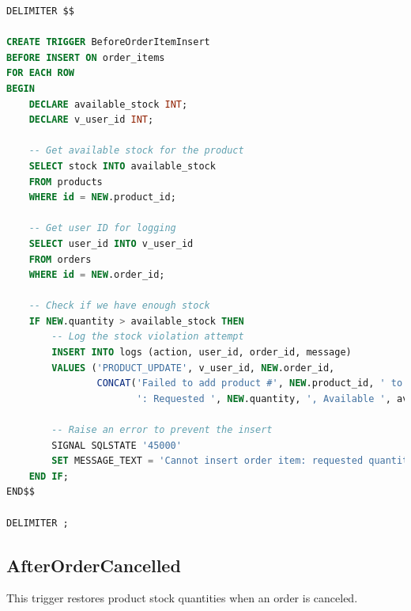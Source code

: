 \documentclass[14pt,a4paper]{article}
\begin{document}
\begin{lstlisting}[language=SQL, caption={BeforeOrderItemInsert Trigger}, label={lst:before-order-item-insert}]
DELIMITER $$

CREATE TRIGGER BeforeOrderItemInsert
BEFORE INSERT ON order_items
FOR EACH ROW
BEGIN
    DECLARE available_stock INT;
    DECLARE v_user_id INT;
    
    -- Get available stock for the product
    SELECT stock INTO available_stock
    FROM products
    WHERE id = NEW.product_id;
    
    -- Get user ID for logging
    SELECT user_id INTO v_user_id
    FROM orders
    WHERE id = NEW.order_id;

    -- Check if we have enough stock
    IF NEW.quantity > available_stock THEN
        -- Log the stock violation attempt
        INSERT INTO logs (action, user_id, order_id, message)
        VALUES ('PRODUCT_UPDATE', v_user_id, NEW.order_id, 
                CONCAT('Failed to add product #', NEW.product_id, ' to order #', NEW.order_id, 
                       ': Requested ', NEW.quantity, ', Available ', available_stock));
                
        -- Raise an error to prevent the insert
        SIGNAL SQLSTATE '45000'
        SET MESSAGE_TEXT = 'Cannot insert order item: requested quantity exceeds available stock';
    END IF;
END$$

DELIMITER ;
\end{lstlisting}

\subsection{AfterOrderCancelled}

This trigger restores product stock quantities when an order is canceled.
\end{document}
